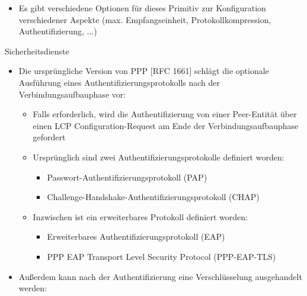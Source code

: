 \documentclass[a4paper]{article}
\begin{document}
\begin{multicols}{3}
\begin{itemize}
              \begin{itemize}
                  \item
                        Es gibt verschiedene Optionen für dieses Primitiv zur Konfiguration
                        verschiedener Aspekte (max. Empfangseinheit, Protokollkompression,
                        Authentifizierung, ...)
              \end{itemize}
    \end{itemize}

    Sicherheitsdienste

    \begin{itemize}
        \item
              Die ursprüngliche Version von PPP {[}RFC 1661{]} schlägt die optionale
              Ausführung eines Authentifizierungsprotokolls nach der
              Verbindungsaufbauphase vor:

              \begin{itemize}
                  \item
                        Falls erforderlich, wird die Authentifizierung von einer
                        Peer-Entität über einen LCP Configuration-Request am Ende der
                        Verbindungsaufbauphase gefordert
                  \item
                        Ursprünglich sind zwei Authentifizierungsprotokolle definiert
                        worden:

                        \begin{itemize}
                            \item
                                  Passwort-Authentifizierungsprotokoll (PAP)
                            \item
                                  Challenge-Handshake-Authentifizierungsprotokoll (CHAP)
                        \end{itemize}
                  \item
                        Inzwischen ist ein erweiterbares Protokoll definiert worden:

                        \begin{itemize}
                            \item
                                  Erweiterbares Authentifizierungsprotokoll (EAP)
                            \item
                                  PPP EAP Transport Level Security Protocol (PPP-EAP-TLS)
                        \end{itemize}
              \end{itemize}
        \item
              Außerdem kann nach der Authentifizierung eine Verschlüsselung
              ausgehandelt werden:


\end{itemize}
\end{multicols}
\end{document}
